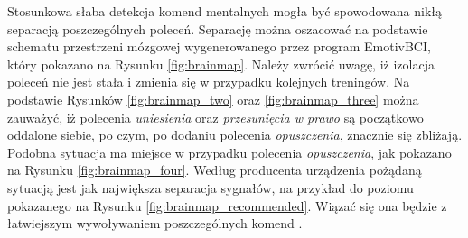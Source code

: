 \documentclass[skorowidz,skroty]{dyplomWEZUT}
\begin{document}
Stosunkowa słaba detekcja komend mentalnych mogła być spowodowana nikłą separacją poszczególnych poleceń. Separację można oszacować na podstawie schematu przestrzeni mózgowej wygenerowanego przez program EmotivBCI, który pokazano na Rysunku \vref{fig:brainmap}. Należy zwrócić uwagę, iż izolacja poleceń nie jest stała i zmienia się w przypadku kolejnych treningów. Na podstawie Rysunków \vref{fig:brainmap_two} oraz \vref{fig:brainmap_three} można zauważyć, iż polecenia \textit{uniesienia} oraz \textit{przesunięcia w prawo} są początkowo oddalone siebie, po czym, po dodaniu polecenia \textit{opuszczenia}, znacznie się zbliżają. Podobna sytuacja ma miejsce w przypadku polecenia \textit{opuszczenia}, jak pokazano na Rysunku \vref{fig:brainmap_four}. Według producenta urządzenia pożądaną sytuacją jest jak największa separacja sygnałów, na przykład do poziomu pokazanego na Rysunku \vref{fig:brainmap_recommended}. Wiązać się ona będzie z łatwiejszym wywoływaniem poszczególnych komend \cite{emotivbcidoc}.
\end{document}
